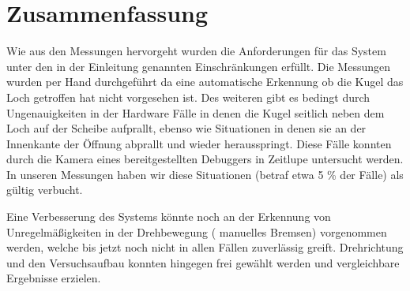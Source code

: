 \chapter{Zusammenfassung} \label{k_zusammenfassung}
Wie aus den Messungen hervorgeht wurden die Anforderungen für das System unter den in der Einleitung genannten Einschränkungen erfüllt.
Die Messungen wurden per Hand durchgeführt da eine automatische Erkennung ob die Kugel das Loch getroffen hat nicht vorgesehen ist.
Des weiteren gibt es bedingt durch Ungenauigkeiten in der Hardware Fälle in denen die Kugel seitlich neben dem Loch auf der Scheibe aufprallt, ebenso wie Situationen in denen sie an der Innenkante der Öffnung abprallt und wieder herausspringt.
Diese Fälle konnten durch die Kamera eines bereitgestellten Debuggers in Zeitlupe untersucht werden.
In unseren Messungen haben wir diese Situationen (betraf etwa 5 \% der Fälle) als gültig verbucht.

Eine Verbesserung des Systems könnte noch an der Erkennung von Unregelmäßigkeiten in der Drehbewegung ( manuelles Bremsen) vorgenommen werden, welche bis jetzt noch nicht in allen Fällen zuverlässig greift.
Drehrichtung und den Versuchsaufbau konnten hingegen frei gewählt werden und vergleichbare Ergebnisse erzielen.
